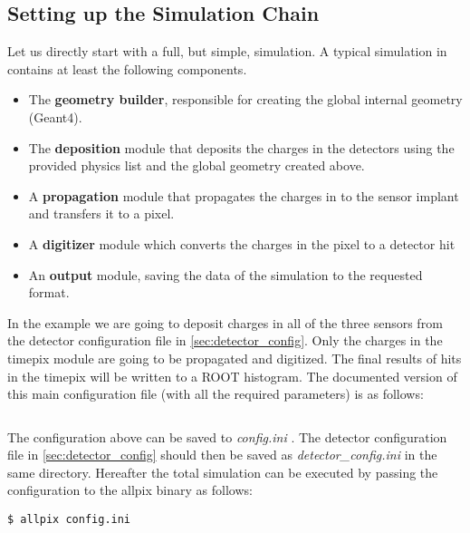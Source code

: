 \subsection{Setting up the Simulation Chain}
Let us directly start with a full, but simple, simulation. A typical simulation in \apsq contains at least the following components.
\begin{itemize}
\item The \textbf{geometry builder}, responsible for creating the global internal geometry (Geant4).
\item The \textbf{deposition} module that deposits the charges in the detectors using the provided physics list and the global geometry created above.
\item A \textbf{propagation} module that propagates the charges in to the sensor implant and transfers it to a pixel.
\item A \textbf{digitizer} module which converts the charges in the pixel to a detector hit
\item An \textbf{output} module, saving the data of the simulation to the requested format.
\end{itemize}

In the example we are going to deposit charges in all of the three sensors from the detector configuration file in \ref{sec:detector_config}. Only the charges in the timepix module are going to be propagated and digitized. The final results of hits in the timepix will be written to a ROOT histogram. The documented version of this main configuration file (with all the required parameters) is as follows:
\inputminted[frame=single,framesep=3pt,breaklines=true,tabsize=2,linenos]{ini}{../../etc/manual_config.ini}

The configuration above can be saved to \textit{config.ini} . The detector configuration file in \ref{sec:detector_config} should then be saved as \textit{detector\_config.ini} in the same directory. Hereafter the total simulation can be executed by passing the configuration to the allpix binary as follows:

\begin{verbatim}
$ allpix config.ini
\end{verbatim}

